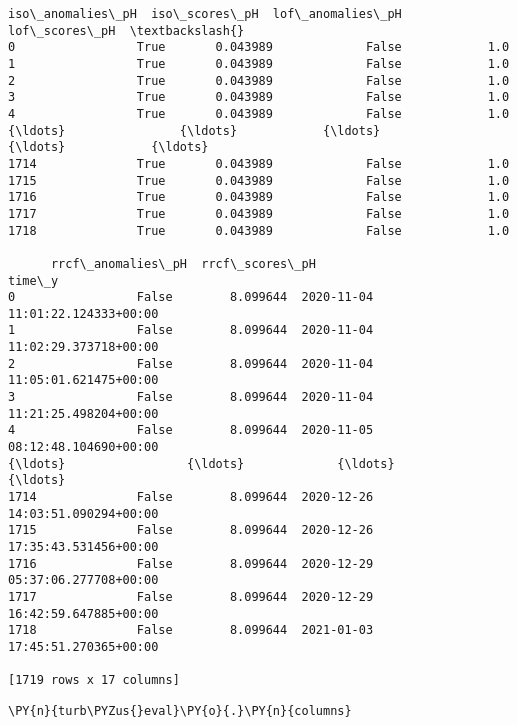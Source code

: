 \begin{tcolorbox}[breakable, size=fbox, boxrule=.5pt, pad at break*=1mm, opacityfill=0]
\begin{Verbatim}[commandchars=\\\{\}]
      iso\_anomalies\_pH  iso\_scores\_pH  lof\_anomalies\_pH  lof\_scores\_pH  \textbackslash{}
0                 True       0.043989             False            1.0
1                 True       0.043989             False            1.0
2                 True       0.043989             False            1.0
3                 True       0.043989             False            1.0
4                 True       0.043989             False            1.0
{\ldots}                {\ldots}            {\ldots}               {\ldots}            {\ldots}
1714              True       0.043989             False            1.0
1715              True       0.043989             False            1.0
1716              True       0.043989             False            1.0
1717              True       0.043989             False            1.0
1718              True       0.043989             False            1.0

      rrcf\_anomalies\_pH  rrcf\_scores\_pH                            time\_y
0                 False        8.099644  2020-11-04 11:01:22.124333+00:00
1                 False        8.099644  2020-11-04 11:02:29.373718+00:00
2                 False        8.099644  2020-11-04 11:05:01.621475+00:00
3                 False        8.099644  2020-11-04 11:21:25.498204+00:00
4                 False        8.099644  2020-11-05 08:12:48.104690+00:00
{\ldots}                 {\ldots}             {\ldots}                               {\ldots}
1714              False        8.099644  2020-12-26 14:03:51.090294+00:00
1715              False        8.099644  2020-12-26 17:35:43.531456+00:00
1716              False        8.099644  2020-12-29 05:37:06.277708+00:00
1717              False        8.099644  2020-12-29 16:42:59.647885+00:00
1718              False        8.099644  2021-01-03 17:45:51.270365+00:00

[1719 rows x 17 columns]
\end{Verbatim}
\end{tcolorbox}
        
    \begin{tcolorbox}[breakable, size=fbox, boxrule=1pt, pad at break*=1mm,colback=cellbackground, colframe=cellborder]
\begin{Verbatim}[commandchars=\\\{\}]
\PY{n}{turb\PYZus{}eval}\PY{o}{.}\PY{n}{columns}
\end{Verbatim}
\end{tcolorbox}

